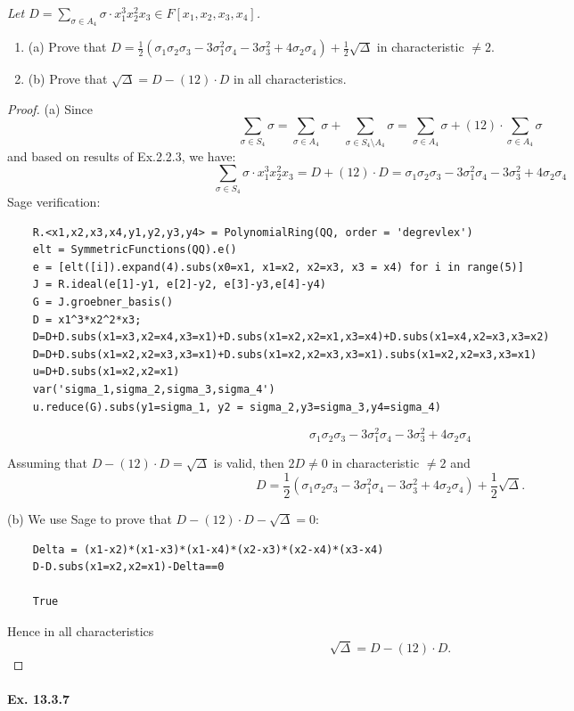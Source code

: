 \documentclass[11pt,a4paper]{article}
\newcommand{\be} {\begin{enumerate}}
\newcommand{\ee} {\end{enumerate}}
\begin{document}
{\it Let $D=\sum_{\sigma \in A_4} \sigma \cdot x_1^3x_2^2x_3 \in F[x_1,x_2,x_3,x_4]$.
\be
\item[(a)] Prove that $D=\frac{1}{2}(\sigma_1\sigma_2\sigma_3 -3 \sigma_1^2 \sigma_4 -3\sigma_3^2 + 4\sigma_2 \sigma_4)+\frac{1}{2}\sqrt{\Delta}$ in characteristic $\ne 2$.
\item[(b)] Prove that $\sqrt{\Delta}=D-(12)\cdot D$ in all characteristics.
\ee
\begin{proof}
\item[(a)] Since $$\sum_{\sigma \in S_4} \sigma =\sum_{\sigma \in A_4} \sigma + \sum_{\sigma \in S_4 \setminus A_4} \sigma =\sum_{\sigma \in A_4} \sigma + (12)\cdot \sum_{\sigma \in  A_4} \sigma $$ and based on results of Ex.2.2.3, we have:
$$\sum_{\sigma \in S_4} \sigma \cdot x_1^3x_2^2x_3 = D+(12)\cdot D =\sigma_1\sigma_2\sigma_3 -3 \sigma_1^2 \sigma_4 -3\sigma_3^2 + 4\sigma_2 \sigma_4 $$
Sage verification:
\begin{verbatim}
    R.<x1,x2,x3,x4,y1,y2,y3,y4> = PolynomialRing(QQ, order = 'degrevlex')
    elt = SymmetricFunctions(QQ).e()
    e = [elt([i]).expand(4).subs(x0=x1, x1=x2, x2=x3, x3 = x4) for i in range(5)]
    J = R.ideal(e[1]-y1, e[2]-y2, e[3]-y3,e[4]-y4)
    G = J.groebner_basis()
    D = x1^3*x2^2*x3;
    D=D+D.subs(x1=x3,x2=x4,x3=x1)+D.subs(x1=x2,x2=x1,x3=x4)+D.subs(x1=x4,x2=x3,x3=x2)
    D=D+D.subs(x1=x2,x2=x3,x3=x1)+D.subs(x1=x2,x2=x3,x3=x1).subs(x1=x2,x2=x3,x3=x1)
    u=D+D.subs(x1=x2,x2=x1)
    var('sigma_1,sigma_2,sigma_3,sigma_4')
    u.reduce(G).subs(y1=sigma_1, y2 = sigma_2,y3=sigma_3,y4=sigma_4)
\end{verbatim}
$$\sigma_1\sigma_2\sigma_3 -3 \sigma_1^2 \sigma_4 -3\sigma_3^2 + 4\sigma_2 \sigma_4 $$

Assuming that $D-(12)\cdot D=\sqrt{\Delta}$ is valid, then $2D \ne 0$ in characteristic $\ne 2$ and
$$D=\frac{1}{2}(\sigma_1\sigma_2\sigma_3 -3 \sigma_1^2 \sigma_4 -3\sigma_3^2 + 4\sigma_2 \sigma_4)+\frac{1}{2}\sqrt{\Delta}.$$
\item[(b)] We use Sage to prove that $D-(12)\cdot D-\sqrt{\Delta}=0$:

\begin{verbatim}
    Delta = (x1-x2)*(x1-x3)*(x1-x4)*(x2-x3)*(x2-x4)*(x3-x4)
    D-D.subs(x1=x2,x2=x1)-Delta==0
    
    True
\end{verbatim}
Hence in all characteristics  $$\sqrt{\Delta}=D-(12)\cdot D.$$
\end{proof}
}

\paragraph{Ex. 13.3.7}
\end{document}
